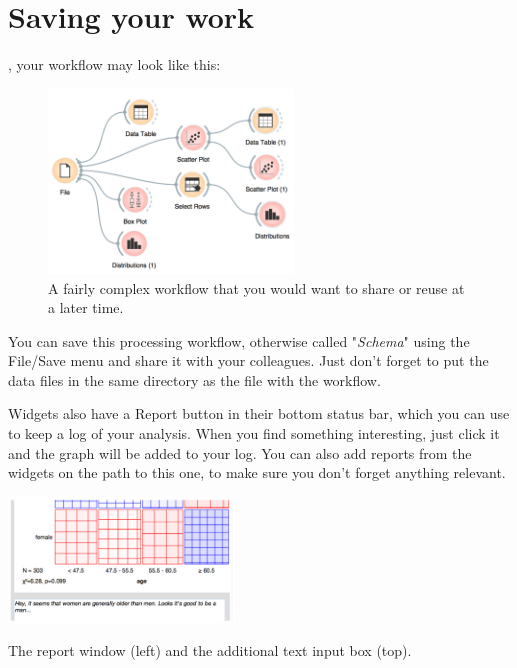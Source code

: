 \chapter{Saving your work}
\label{ch:saving_your_work}

, your workflow may look like this:
\begin{figure}[h]
  \centering
  \includegraphics[width=65mm]{graphics/ch-saving/saving-fig1.png}%
  \caption{A fairly complex workflow that you would want to share or reuse at a later time.}
  \label{fig:saveing-fig1}
\end{figure}

You can save this processing workflow, otherwise called "\textit{Schema}" using the File/Save menu and share it with your colleagues. Just don't forget to put the data files in the same directory as the file with the workflow.

Widgets also have a Report button in their bottom status bar, which you can use to keep a log of your analysis. When you find something interesting, just click it and the graph  will be added to your log. You can also add reports from the widgets on the path to this one, to make sure you don't forget anything relevant.

\begin{marginfigure}
  \includegraphics[width=60mm]{graphics/ch-saving/saving-fig3.png}%
  ~\vspace{1.0cm}
  \caption{The report window (left) and the additional text input box (top).}
  \label{fig:saveing-fig3}
\end{marginfigure}

